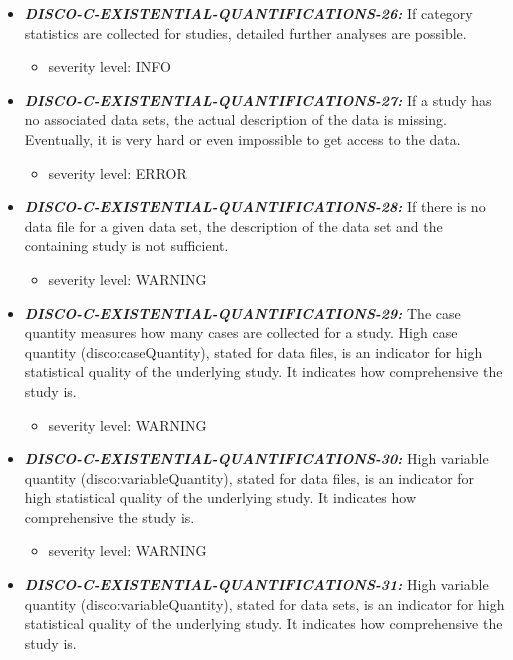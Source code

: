 \documentclass{llncs}
\begin{document}
\begin{itemize}
\begin{itemize}
	\end{itemize}
	\item \textbf{{\em DISCO-C-EXISTENTIAL-QUANTIFICATIONS-26:}} 
  If category statistics are collected for studies, detailed further analyses are possible. 
	\begin{itemize}
		\item severity level: INFO
	\end{itemize}
	\item \textbf{{\em DISCO-C-EXISTENTIAL-QUANTIFICATIONS-27:}} 
  If a study has no associated data sets, the actual description of the data is missing. 
	Eventually, it is very hard or even impossible to get access to the data.
	\begin{itemize}
		\item severity level: ERROR
	\end{itemize}
	\item \textbf{{\em DISCO-C-EXISTENTIAL-QUANTIFICATIONS-28:}} 
  If there is no data file for a given data set, the description of the data set and the containing study is not sufficient.
	\begin{itemize}
		\item severity level: WARNING
	\end{itemize}
	\item \textbf{{\em DISCO-C-EXISTENTIAL-QUANTIFICATIONS-29:}} 
	The case quantity measures how many cases are collected for a study.
  High case quantity (disco:caseQuantity), stated for data files, is an indicator for high statistical quality of the underlying study.
	It indicates how comprehensive the study is.
	\begin{itemize}
		\item severity level: WARNING
	\end{itemize}
	\item \textbf{{\em DISCO-C-EXISTENTIAL-QUANTIFICATIONS-30:}} 
  High variable quantity (disco:variableQuantity), stated for data files, is an indicator for high statistical quality of the underlying study.
	It indicates how comprehensive the study is.
	\begin{itemize}
		\item severity level: WARNING
	\end{itemize}
	\item \textbf{{\em DISCO-C-EXISTENTIAL-QUANTIFICATIONS-31:}} 
  High variable quantity (disco:variableQuantity), stated for data sets, is an indicator for high statistical quality of the underlying study.
	It indicates how comprehensive the study is.

\end{itemize}
\end{document}
